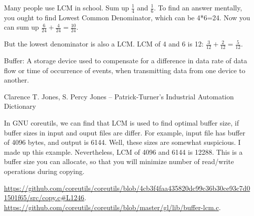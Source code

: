 
Many people use \ac{LCM} in school. Sum up $\frac{1}{4}$ and $\frac{1}{6}$.
To find an answer mentally, you ought to find Lowest Common Denominator, which can be 4*6=24.
Now you can sum up $\frac{6}{24} + \frac{4}{24} = \frac{10}{24}$.

But the lowest denominator is also a LCM.
LCM of 4 and 6 is 12: $\frac{3}{12} + \frac{2}{12} = \frac{5}{12}$.

\leveldown{}


\epigraph{Buffer: A storage device used to compensate for a difference in data rate of data flow or time of occurrence of events, when transmitting data from one device to another.}
{Clarence T. Jones, S. Percy Jones -- Patrick-Turner's Industrial Automation Dictionary}

In GNU coreutils, we can find that LCM is used to find optimal buffer size, if buffer sizes in input and ouput files are differ.
For example, input file has buffer of 4096 bytes, and output is 6144.
Well, these sizes are somewhat suspicious. I made up this example.
Nevertheless, LCM of 4096 and 6144 is 12288. This is a buffer size you can allocate, so that you will minimize number of read/write operations during copying.

\url{https://github.com/coreutils/coreutils/blob/4cb3f4faa435820dc99c36b30ce93c7d01501f65/src/copy.c#L1246}.
\url{https://github.com/coreutils/coreutils/blob/master/gl/lib/buffer-lcm.c}.

\levelup{}

